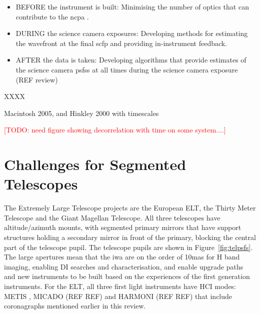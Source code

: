 \documentclass[letterpaper]{ar-1col}
\newcommand{\todo}[1]{\textcolor{red}{[TODO: #1]}}
\begin{document}
\begin{itemize}
    \item BEFORE the instrument is built: Minimising the number of optics that can contribute to the \ac{ncpa} \citep[by making the optics optomechanically and thermally stable; ][]{Absil24}.
    \item DURING the science camera exposures: Developing methods for estimating the wavefront at the final \ac{scfp} and providing in-instrument feedback.
    
    \item AFTER the data is taken: Developing algorithms that provide estimates of the science camera \acp{psf}s at all times during the science camera exposure (REF review)

\end{itemize}

XXXX

Macintosh 2005, and Hinkley 2000 with timescales

\todo{need figure showing decorrelation with time on some system....}









\section{Challenges for Segmented Telescopes}

The Extremely Large Telescope projects are the European ELT, the Thirty Meter Telescope and the Giant Magellan Telescope.
%
All three telescopes have altitude/azimuth mounts, with segmented primary mirrors that have support structures holding a secondary mirror in front of the primary, blocking the central part of the telescope pupil.
%
The telescope pupils are shown in Figure~\ref{fig:telpsfs}.
%
The large apertures mean that the \ac{iwa} are on the order of 10mas for H band imaging, enabling DI searches and characterisation, and enable upgrade paths and new instruments to be built based on the experiences of the first generation instruments.
%
For the ELT, all three first light instruments have HCI modes: METIS \citep{Brandl21,Kenworthy16,Carlomagno20}, MICADO (REF REF) and HARMONI (REF REF) that include coronagraphs mentioned earlier in this review.
%
\end{document}
